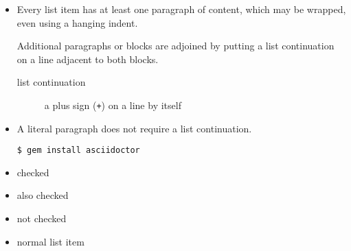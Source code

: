 \begin{itemize}

\item Every list item has at least one paragraph of content,
which may be wrapped, even using a hanging indent.

Additional paragraphs or blocks are adjoined by putting
a list continuation on a line adjacent to both blocks.


\begin{description}

\item[list continuation]a plus sign ({\tt +}) on a line by itself

\end{description}

\item A literal paragraph does not require a list continuation.

\begin{verbatim}
$ gem install asciidoctor
\end{verbatim}
\end{itemize}


\begin{itemize}

\item checked

\item also checked

\item not checked

\item normal list item

\end{itemize}


